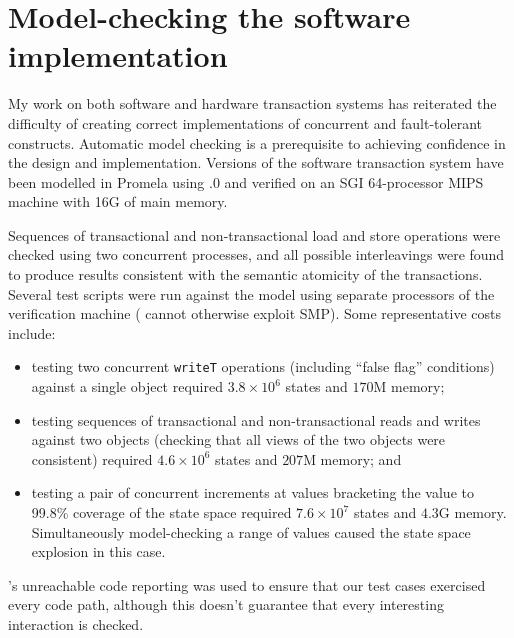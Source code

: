 \chapter{Model-checking the software implementation}\label{sec:verification}
My work on both software and hardware transaction systems has
reiterated the difficulty of creating correct implementations of
concurrent and fault-tolerant constructs.  Automatic model checking is
a prerequisite to achieving confidence in the design and implementation.
Versions of the software transaction system have been modelled in
Promela using .0 and verified on an SGI 64-processor MIPS
machine with 16G of main memory.

Sequences of transactional and non-transactional load and store
operations were checked using two concurrent processes, and all possible
interleavings were found to produce results consistent with
the semantic atomicity of the transactions.  
Several test scripts were run against the
model using separate processors of the verification machine (\Spin
cannot otherwise exploit SMP).  Some representative costs include:
\begin{itemize}
\item testing two concurrent {\tt writeT} operations (including
  ``false flag'' conditions) against a single object required $3.8\times
  10^6$ states and $170$M memory;
\item testing sequences of transactional and non-transactional reads
  and writes against two objects (checking that all views of the two
  objects were consistent) required $4.6\times 10^6$ states and $207$M
  memory; and
\item testing a pair of concurrent increments at values bracketing the
  \FLAG value to 99.8\% coverage of the state space required
  $7.6\times 10^7$ states and $4.3$G memory.  Simultaneously
  model-checking a range of values caused the state space explosion
  in this case.
\end{itemize}
\Spin's unreachable code reporting was used to ensure that our test
cases exercised every code path, although this doesn't guarantee that
every interesting interaction is checked.

